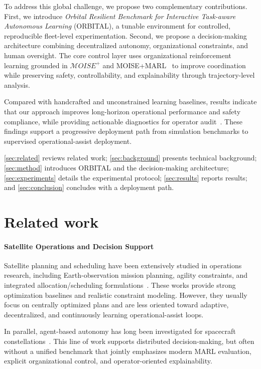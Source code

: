 \documentclass[sigconf]{aamas}
\begin{document}
To address this global challenge, we propose two complementary contributions. First, we introduce \textit{Orbital Resilient Benchmark for Interactive Task-aware Autonomous Learning} (ORBITAL), a tunable environment for controlled, reproducible fleet-level experimentation. Second, we propose a decision-making architecture combining decentralized autonomy, organizational constraints, and human oversight. The core control layer uses organizational reinforcement learning grounded in $\mathcal{M}OISE^+$ and MOISE+MARL~\cite{Hubner2002,Hubner2007,soule2024moise_marl} to improve coordination while preserving safety, controllability, and explainability through trajectory-level analysis.

Compared with handcrafted and unconstrained learning baselines, results indicate that our approach improves long-horizon operational performance and safety compliance, while providing actionable diagnostics for operator audit~\cite{soule2024moise_marl}. These findings support a progressive deployment path from simulation benchmarks to supervised operational-assist deployment.

\autoref{sec:related} reviews related work; \autoref{sec:background} presents technical background; \autoref{sec:method} introduces ORBITAL and the decision-making architecture; \autoref{sec:experiments} details the experimental protocol; \autoref{sec:results} reports results; and \autoref{sec:conclusion} concludes with a deployment path.

\section{Related work}
\label{sec:related}

\paragraph{Satellite Operations and Decision Support}
Satellite planning and scheduling have been extensively studied in operations research, including Earth-observation mission planning, agility constraints, and integrated allocation/scheduling formulations~\cite{ferrari2025ssp_survey,rocha2025iaeossp,govoni2026multi_sat_task_allocation}. These works provide strong optimization baselines and realistic constraint modeling. However, they usually focus on centrally optimized plans and are less oriented toward adaptive, decentralized, and continuously learning operational-assist loops.

In parallel, agent-based autonomy has long been investigated for spacecraft constellations~\cite{schetter2003satellite_autonomy}. This line of work supports distributed decision-making, but often without a unified benchmark that jointly emphasizes modern MARL evaluation, explicit organizational control, and operator-oriented explainability.
\end{document}
